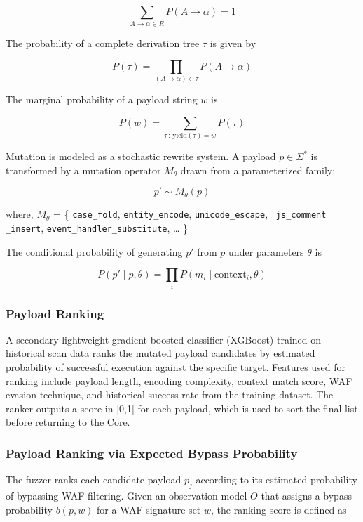 \[
\sum_{A \rightarrow \alpha \in R} P(A \rightarrow \alpha) = 1
\]

The probability of a complete derivation tree \(\tau\) is given by

\[
P(\tau) =
\prod_{(A \rightarrow \alpha) \in \tau}
P(A \rightarrow \alpha)
\]

The marginal probability of a payload string \(w\) is

\[
P(w) =
\sum_{\tau \,:\, \mathrm{yield}(\tau)=w}
P(\tau)
\]

Mutation is modeled as a stochastic rewrite system. A payload
\(p \in \Sigma^{*}\) is transformed by a mutation operator
\(M_{\theta}\) drawn from a parameterized family:

\[
p' \sim M_{\theta}(p)
\]

where,
$
M_{\theta}$ =
\{ 
\texttt{case\_fold},\allowbreak
\texttt{entity\_encode},\allowbreak
\texttt{unicode\_escape},\allowbreak
\texttt{ js\_comment} \linebreak \texttt{\_insert},\allowbreak
\texttt{event\_handler\_substitute},\allowbreak
\ldots
\}


The conditional probability of generating \(p'\) from \(p\) under parameters
\(\theta\) is

\[
P(p' \mid p, \theta)
=
\prod_{i}
P(m_i \mid \mathrm{context}_i, \theta)
\]

\subsubsection{ Payload Ranking}
A secondary lightweight gradient-boosted classifier (XGBoost) trained on historical scan data ranks the mutated payload candidates by estimated probability of successful execution against the specific target. Features used for ranking include payload length, encoding complexity, context match score, WAF evasion technique, and historical success rate from the training dataset. The ranker outputs a score in [0,1] for each payload, which is used to sort the final list before returning to the Core.
\subsubsection{Payload Ranking via Expected Bypass Probability}
The fuzzer ranks each candidate payload \(p_j\) according to its estimated probability of
bypassing WAF filtering. Given an observation model \(O\) that assigns a bypass probability
\(b(p,w)\) for a WAF signature set \(w\), the ranking score is defined as

